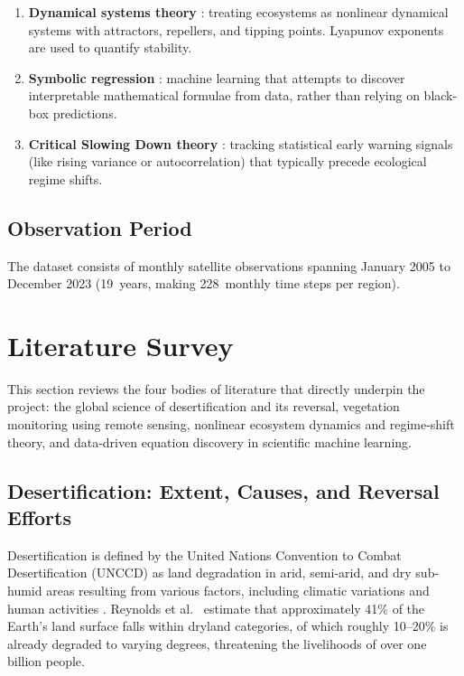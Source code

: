 \documentclass[12pt, a4paper]{article}
\begin{document}
\begin{enumerate}[leftmargin=1.6em]
    \item \textbf{Dynamical systems theory} \cite{strogatz2015}: treating ecosystems as nonlinear dynamical systems with attractors, repellers, and tipping points. Lyapunov exponents are used to quantify stability.
    \item \textbf{Symbolic regression} \cite{cranmer2023}: machine learning that attempts to discover interpretable mathematical formulae from data, rather than relying on black-box predictions.
    \item \textbf{Critical Slowing Down theory} \cite{scheffer2009,dakos2012}: tracking statistical early warning signals (like rising variance or autocorrelation) that typically precede ecological regime shifts.
\end{enumerate}

\subsection{Observation Period}

The dataset consists of monthly satellite observations spanning January 2005 to December 2023 (19~years, making 228~monthly time steps per region).

\section{Literature Survey}
\label{sec:litsurvey}

This section reviews the four bodies of literature that directly underpin the project: the global science of desertification and its reversal, vegetation monitoring using remote sensing, nonlinear ecosystem dynamics and regime-shift theory, and data-driven equation discovery in scientific machine learning.

\subsection{Desertification: Extent, Causes, and Reversal Efforts}

Desertification is defined by the United Nations Convention to Combat Desertification (UNCCD) as land degradation in arid, semi-arid, and dry sub-humid areas resulting from various factors, including climatic variations and human activities \cite{reynolds2007}. Reynolds et al.\ \cite{reynolds2007} estimate that approximately 41\% of the Earth's land surface falls within dryland categories, of which roughly 10--20\% is already degraded to varying degrees, threatening the livelihoods of over one billion people.
\end{document}
